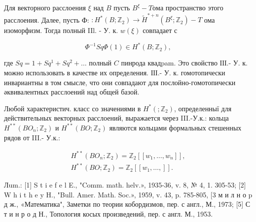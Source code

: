\documentclass[10pt]{article}
\begin{document}
Для векторного расслоения $\xi$ над $B$ пусть $B^{\xi}-T о м а$ пространство этого расслоения. Далее, пусть Ф: $: H^{*}\left(B ; \mathbb{Z}_{2}\right) \longrightarrow \tilde{H}^{*+n}\left(B^{\xi} ; \mathbb{Z}_{2}\right)-T$ ома изоморфизм. Тогда полный IIl. - У. к. $w(\xi)$ совпадает с



\[

\Phi^{-1} S q \Phi(1) \in H^{*}\left(B ; \mathbb{Z}_{2}\right),

\]



где $S q=1+S q^{1}+S q^{2}+\ldots$ полный $C$ пинрода квадpam. Это свойство ІІІ.- У. к. можно использовать в качестве их определения. ІІІ.- У. к. гомотопически инвариантны в том смысле, что они совпадают для послойно-гомотопически әквивалентных расслоений над общей базой.



Любой характеристич. класс со значениями в $H^{*}\left(; \mathbb{Z}_{2}\right)$, определенныї для действительных векторных расслоений, выражается через III.-У.к.: кольца $H^{* *}\left(B O_{n} ; \mathbb{Z}_{2}\right)$ и $H^{* *}\left(B O ; \mathbb{Z}_{2}\right)$ являются кольцами формальных стешенных рядов от III.- У.к.:



\[

\begin{gathered}

H^{* *}\left(B O_{n} ; \mathbb{Z}_{2}\right)=\mathbb{Z}_{2}\left[\left[w_{1}, \ldots, w_{n}\right]\right], \\

H^{* *}\left(B O ; \mathbb{Z}_{2}\right)=\mathbb{Z}_{2}\left[\left[w_{1}, \ldots,\right]\right] .

\end{gathered}

\]



Лum.: [1] S t i e f e l E., "Comm. math. helv.», 1935-36, v. 8, № 4, 1. 305-53; [2] W h i t h e y H., "Bull. Amer. Math. Soc.», 1959, v. 43, p. 785-805, [3 м и л н о $\mathrm{p}$ д ж., «Математика", Заметки по теории кобордизмов, пер. с англ., М., 1973; [5] С т и н р о д Н., Топология косых произведений, пер. с англ. М., 1953.
\end{document}
